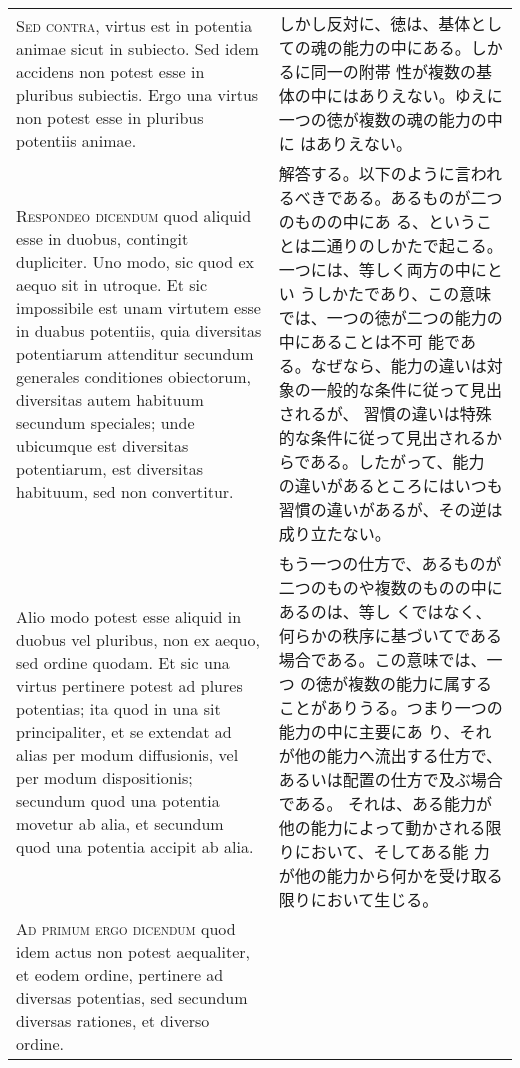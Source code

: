 \documentclass[10pt]{jsarticle}
\begin{document}
\begin{longtable}{p{21em}p{21em}}
{\scshape Sed contra}, virtus est in potentia animae sicut in
subiecto. Sed idem accidens non potest esse in pluribus
subiectis. Ergo una virtus non potest esse in pluribus potentiis
animae.

&

しかし反対に、徳は、基体としての魂の能力の中にある。しかるに同一の附帯
性が複数の基体の中にはありえない。ゆえに一つの徳が複数の魂の能力の中に
はありえない。

\\

{\scshape Respondeo dicendum} quod aliquid esse in duobus, contingit
dupliciter. Uno modo, sic quod ex aequo sit in utroque. Et sic
impossibile est unam virtutem esse in duabus potentiis, quia
diversitas potentiarum attenditur secundum generales conditiones
obiectorum, diversitas autem habituum secundum speciales; unde
ubicumque est diversitas potentiarum, est diversitas habituum, sed non
convertitur.

&

解答する。以下のように言われるべきである。あるものが二つのものの中にあ
る、ということは二通りのしかたで起こる。一つには、等しく両方の中にとい
うしかたであり、この意味では、一つの徳が二つの能力の中にあることは不可
能である。なぜなら、能力の違いは対象の一般的な条件に従って見出されるが、
習慣の違いは特殊的な条件に従って見出されるからである。したがって、能力
の違いがあるところにはいつも習慣の違いがあるが、その逆は成り立たない。

\\

Alio modo potest esse aliquid in duobus vel pluribus, non ex aequo,
sed ordine quodam. Et sic una virtus pertinere potest ad plures
potentias; ita quod in una sit principaliter, et se extendat ad alias
per modum diffusionis, vel per modum dispositionis; secundum quod una
potentia movetur ab alia, et secundum quod una potentia accipit ab
alia.

&

もう一つの仕方で、あるものが二つのものや複数のものの中にあるのは、等し
くではなく、何らかの秩序に基づいてである場合である。この意味では、一つ
の徳が複数の能力に属することがありうる。つまり一つの能力の中に主要にあ
り、それが他の能力へ流出する仕方で、あるいは配置の仕方で及ぶ場合である。
それは、ある能力が他の能力によって動かされる限りにおいて、そしてある能
力が他の能力から何かを受け取る限りにおいて生じる。

\\

{\scshape Ad primum ergo dicendum} quod idem actus non potest
aequaliter, et eodem ordine, pertinere ad diversas potentias, sed
secundum diversas rationes, et diverso ordine.


\end{longtable}
\end{document}
